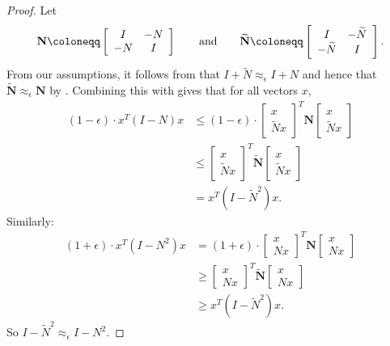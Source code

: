 \documentclass{toc}
\newcommand{\wt}{\widetilde}   %
\numberwithin{myalgctr}{section}
\theoremstyle{named}
\begin{document}
\begin{proof}
Let 
\[
\mathbf{N}\coloneqq \left[
\begin{array}{c c}
I & -N \\
-N & I
\end{array}
\right] 
\qquad
\text{and}
\qquad
\wt{\mathbf{N}}\coloneqq \left[
\begin{array}{c c}
I & -\wt{N} \\
-\wt{N} & I
\end{array}
\right] .
\]
{}From our assumptions, it follows from  that $I+\wt{N}\approx_{\epsilon}I+N$ and hence that $\wt{\mathbf{N}}\approx_{\epsilon}\mathbf{N}$ by . Combining this with  gives that for all vectors $x$,
\begin{align*}
(1-\epsilon)\cdot x^T(I-N)x&\leq (1-\epsilon)\cdot \left[
\begin{array}{c}
x \\
\wt{N}x
\end{array}\right]^{T}\mathbf{N}\left[
\begin{array}{c}
x \\
\wt{N}x
\end{array}\right]\\
&\leq \left[
\begin{array}{c}
x \\
\wt{N}x
\end{array}\right]^{T}\wt{\mathbf{N}}\left[
\begin{array}{c}
x \\
\wt{N}x
\end{array}\right]\\
&=x^{T}(I-\wt{N}^2)x.
\end{align*}
Similarly:
\begin{align*}
(1+\epsilon)\cdot x^T(I-N^2)x&= (1+\epsilon)\cdot \left[
\begin{array}{c}
x \\
Nx
\end{array}\right]^{T}\mathbf{N}\left[
\begin{array}{c}
x \\
Nx
\end{array}\right]\\
&\geq \left[
\begin{array}{c}
x \\
Nx
\end{array}\right]^{T}\wt{\mathbf{N}}\left[
\begin{array}{c}
x \\
Nx
\end{array}\right]\\
&\geq x^{T}(I-\wt{N}^2)x.
\end{align*}
So $I-\wt{N}^2\approx_{\epsilon}I-N^{2}$.
\end{proof}
\end{document}

